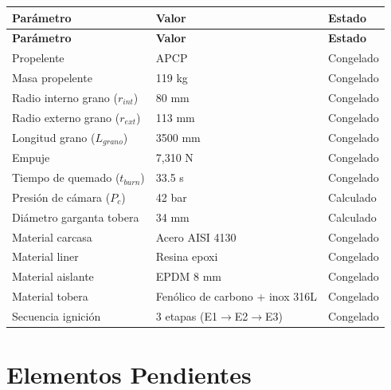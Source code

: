 \documentclass[11pt, a4paper]{article}
\begin{document}
\begin{longtable}{L{6cm} C{3cm} C{2cm}}
  \color{white}\textbf{Par\'{a}metro} &
  \color{white}\textbf{Valor} &
  \color{white}\textbf{Estado} \\
  \endfirsthead
  \color{white}\textbf{Par\'{a}metro} &
  \color{white}\textbf{Valor} &
  \color{white}\textbf{Estado} \\
  \endhead
  Propelente                           & APCP                    & Congelado \\
  Masa propelente                      & 119 kg                  & Congelado \\
  Radio interno grano ($r_{int}$)      & 80 mm                   & Congelado \\
  Radio externo grano ($r_{ext}$)      & 113 mm                  & Congelado \\
  Longitud grano ($L_{grano}$)         & 3500 mm                 & Congelado \\
  Empuje                               & 7{,}310 N               & Congelado \\
  Tiempo de quemado ($t_{burn}$)       & 33.5 s                  & Congelado \\
  Presi\'{o}n de c\'{a}mara ($P_c$)   & 42 bar                  & Calculado \\
  Di\'{a}metro garganta tobera         & 34 mm                   & Calculado \\
  Material carcasa                     & Acero AISI 4130         & Congelado \\
  Material liner                       & Resina epoxi            & Congelado \\
  Material aislante                    & EPDM 8 mm               & Congelado \\
  Material tobera                      & Fen\'{o}lico de carbono + inox 316L & Congelado \\
  Secuencia ignici\'{o}n              & 3 etapas (E1$\to$E2$\to$E3) & Congelado \\
\end{longtable}

\section{Elementos Pendientes}
\end{document}
